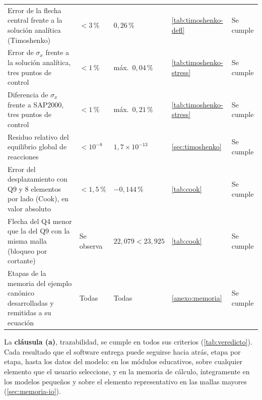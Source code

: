 {\begin{longtable}{@{}>{\raggedright\arraybackslash}p{4.2cm}>{\raggedright\arraybackslash}p{2.5cm}>{\raggedright\arraybackslash}p{3.5cm}>{\raggedright\arraybackslash}p{2.6cm}>{\raggedright\arraybackslash}p{1.9cm}@{}}
Error de la flecha central frente a la solución analítica (Timoshenko) & $< 3\,\%$ & $0{,}26\,\%$ & \autoref{tab:timoshenko-defl} & Se cumple \\
Error de $\sigma_x$ frente a la solución analítica, tres puntos de control & $< 1\,\%$ & máx.\ $0{,}04\,\%$ & \autoref{tab:timoshenko-stress} & Se cumple \\
Diferencia de $\sigma_x$ frente a SAP2000, tres puntos de control & $< 1\,\%$ & máx.\ $0{,}21\,\%$ & \autoref{tab:timoshenko-stress} & Se cumple \\
Residuo relativo del equilibrio global de reacciones & $< 10^{-8}$ & $1{,}7\times10^{-13}$ & \autoref{sec:timoshenko} & Se cumple \\
Error del desplazamiento con Q9 y 8 elementos por lado (Cook), en valor absoluto & $< 1{,}5\,\%$ & $-0{,}144\,\%$ & \autoref{tab:cook} & Se cumple \\
Flecha del Q4 menor que la del Q9 con la misma malla (bloqueo por cortante) & Se observa & $22{,}079 < 23{,}925$ & \autoref{tab:cook} & Se cumple \\
Etapas de la memoria del ejemplo canónico desarrolladas y remitidas a su ecuación & Todas & Todas & \autoref{anexo:memoria} & Se cumple \\
\end{longtable}}
{\singlespacing{}}

La \textbf{cláusula (a)}, trazabilidad, se cumple en todos sus criterios (\autoref{tab:veredicto}). Cada resultado que el software entrega puede seguirse hacia atrás, etapa por etapa, hasta los datos del modelo: en los módulos educativos, sobre cualquier elemento que el usuario seleccione, y en la memoria de cálculo, íntegramente en los modelos pequeños y sobre el elemento representativo en las mallas mayores (\autoref{sec:memoria-io}).

